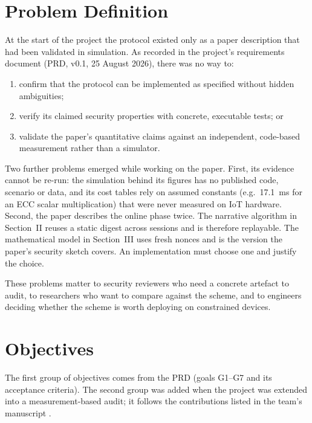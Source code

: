 \documentclass[12pt,a4paper,oneside]{report}
\numberwithin{equation}{chapter}
\begin{document}
\section{Problem Definition}
At the start of the project the protocol existed only as a paper description that had been validated in simulation. As recorded in the project's requirements document (PRD, v0.1, 25 August 2026), there was no way to:
\begin{enumerate}[nosep]
  \item confirm that the protocol can be implemented as specified without hidden ambiguities;
  \item verify its claimed security properties with concrete, executable tests; or
  \item validate the paper's quantitative claims against an independent, code-based measurement rather than a simulator.
\end{enumerate}
Two further problems emerged while working on the paper. First, its evidence cannot be re-run: the simulation behind its figures has no published code, scenario or data, and its cost tables rely on assumed constants (e.g.\ 17.1~ms for an ECC scalar multiplication) that were never measured on IoT hardware. Second, the paper describes the online phase twice. The narrative algorithm in Section~II reuses a static digest across sessions and is therefore replayable. The mathematical model in Section~III uses fresh nonces and is the version the paper's security sketch covers. An implementation must choose one and justify the choice.

These problems matter to security reviewers who need a concrete artefact to audit, to researchers who want to compare against the scheme, and to engineers deciding whether the scheme is worth deploying on constrained devices.

\section{Objectives}
The first group of objectives comes from the PRD (goals G1--G7 and its acceptance criteria). The second group was added when the project was extended into a measurement-based audit; it follows the contributions listed in the team's manuscript \cite{kerkar2026audit}.
\end{document}
